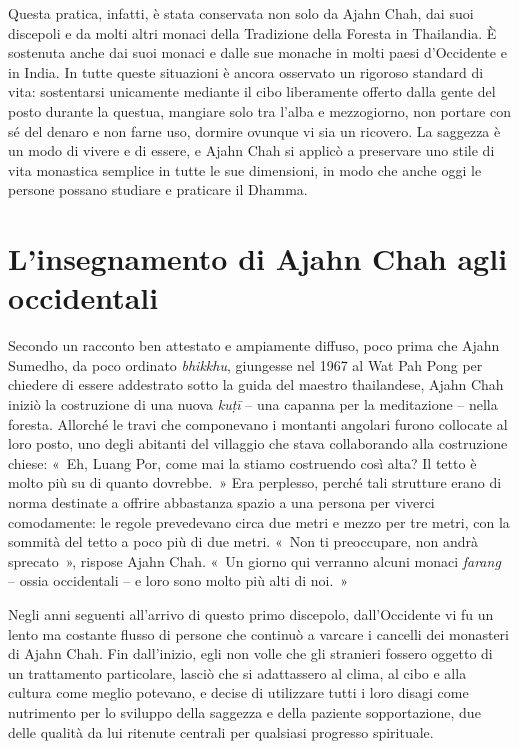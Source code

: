 Questa pratica, infatti, è stata conservata non solo da Ajahn Chah, dai
suoi discepoli e da molti altri monaci della Tradizione della Foresta in
Thailandia. È sostenuta anche dai suoi monaci e dalle sue monache in
molti paesi d'Occidente e in India. In tutte queste situazioni è ancora
osservato un rigoroso standard di vita: sostentarsi unicamente mediante
il cibo liberamente offerto dalla gente del posto durante la questua,
mangiare solo tra l'alba e mezzogiorno, non portare con sé del denaro e
non farne uso, dormire ovunque vi sia un ricovero. La saggezza è un modo
di vivere e di essere, e Ajahn Chah si applicò a preservare uno stile di
vita monastica semplice in tutte le sue dimensioni, in modo che anche
oggi le persone possano studiare e praticare il Dhamma.

\section{L'insegnamento di Ajahn Chah agli occidentali}

Secondo un racconto ben attestato e ampiamente diffuso, poco prima che
Ajahn Sumedho, da poco ordinato \emph{bhikkhu}, giungesse nel 1967 al
Wat Pah Pong per chiedere di essere addestrato sotto la guida del
maestro thailandese, Ajahn Chah iniziò la costruzione di una nuova
\emph{kuṭī} -- una capanna per la meditazione -- nella foresta. Allorché
le travi che componevano i montanti angolari furono collocate al loro
posto, uno degli abitanti del villaggio che stava collaborando alla
costruzione chiese: «~Eh, Luang Por, come mai la stiamo costruendo così
alta? Il tetto è molto più su di quanto dovrebbe.~» Era perplesso,
perché tali strutture erano di norma destinate a offrire abbastanza
spazio a una persona per viverci comodamente: le regole prevedevano
circa due metri e mezzo per tre metri, con la sommità del tetto a poco
più di due metri. «~Non ti preoccupare, non andrà sprecato~», rispose
Ajahn Chah. «~Un giorno qui verranno alcuni monaci \emph{farang} --
ossia occidentali -- e loro sono molto più alti di noi.~»

Negli anni seguenti all'arrivo di questo primo discepolo,
dall'Occidente vi fu un lento ma costante flusso di persone che
continuò a varcare i cancelli dei monasteri di Ajahn Chah. Fin
dall'inizio, egli non volle che gli stranieri fossero oggetto di un
trattamento particolare, lasciò che si adattassero al clima, al cibo e
alla cultura come meglio potevano, e decise di utilizzare tutti i loro
disagi come nutrimento per lo sviluppo della saggezza e della paziente
sopportazione, due delle qualità da lui ritenute centrali per qualsiasi
progresso spirituale.

